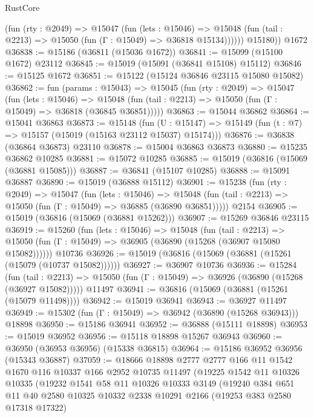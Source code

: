 \begin{lexlean}{RustCore}
\begin{coremodule}
            (fun (rty : @2049) =>
            @15047
              (fun (lets : @15046) =>
              @15048 (fun (tail : @2213) => @15050 (fun (Γ : @15049) => @36818 @15134))))))
        @15180))
    @1672
@36838 := @15186 (@36811 (@15036 @1672))
@36841 := @15099 (@15100 @1672) @23112
@36845 := @15019 (@15091 (@36841 @15108) @15112)
@36846 := @15125 @1672
@36851 := @15122 (@15124 @36846 @23115 @15080 @15082)
@36862 := fun (params : @15043) =>
  @15045
    (fun (rty : @2049) =>
    @15047
      (fun (lets : @15046) =>
      @15048 (fun (tail : @2213) => @15050 (fun (Γ : @15049) => @36818 (@36845 @36851)))))
@36863 := @15044 @36862
@36864 := @15041 @36863
@36873 := @15148
    (fun (U : @15147) => @15149 (fun (t : @7) => @15157 (@15019 (@15163 @23112 @15037) @15174)))
@36876 := @36838 (@36864 @36873) @23110
@36878 := @15004 @36863 @36873
@36880 := @15235 @36862 @10285
@36881 := @15072 @10285
@36885 := @15019 (@36816 (@15069 (@36881 @15085)))
@36887 := @36841 (@15107 @10285)
@36888 := @15091 @36887
@36890 := @15019 (@36888 @15112)
@36901 := @15238
    (fun (rty : @2049) =>
    @15047
      (fun (lets : @15046) =>
      @15048 (fun (tail : @2213) => @15050 (fun (Γ : @15049) => @36885 (@36890 @36851)))))
    @2154
@36905 := @15019 (@36816 (@15069 (@36881 @15262)))
@36907 := @15269 @36846 @23115
@36919 := @15260
    (fun (lets : @15046) =>
    @15048
      (fun (tail : @2213) =>
      @15050 (fun (Γ : @15049) => @36905 (@36890 (@15268 (@36907 @15080 @15082))))))
    @10736
@36926 := @15019 (@36816 (@15069 (@36881 (@15261 (@15079 (@10737 @15082))))))
@36927 := @36907 @10736
@36936 := @15284
    (fun (tail : @2213) => @15050 (fun (Γ : @15049) => @36926 (@36890 (@15268 (@36927 @15082)))))
    @11497
@36941 := @36816 (@15069 (@36881 (@15261 (@15079 @11498))))
@36942 := @15019 @36941
@36943 := @36927 @11497
@36949 := @15302 (fun (Γ : @15049) => @36942 (@36890 (@15268 @36943))) @18898
@36950 := @15186 @36941
@36952 := @36888 (@15111 @18898)
@36953 := @15019 @36952
@36956 := @15118 @18898 @15267 @36943
@36960 := @36950 (@36953 @36956) (@15338 @36815)
@36964 := @15186 @36952 @36956 (@15343 @36887)
@37059 := @18666
    @18898
    @2777
    @2777
    @166
    @11
    @1542
    @1670
    @116
    @10337
    @166
    @2952
    @10735
    @11497
    (@19225
      @1542
      @11
      @10326
      @10335
      (@19232
        @1541
        @58
        @11
        @10326
        @10333
        @3149
        (@19240
          @384
          @651
          @11
          @40
          @2580
          @10325
          @10332
          @2338
          @10291
          @2166
          (@19253 @383 @2580 @17318 @17322)

\end{coremodule}
\end{lexlean}

